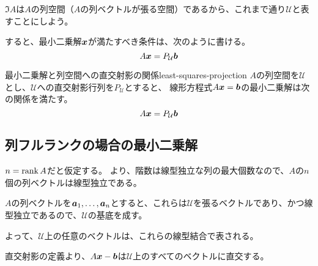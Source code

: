 \documentclass[../../../topic_linear-algebra]{subfiles}
\begin{document}
\br

$\Im A$は$A$の列空間（$A$の列ベクトルが張る空間）であるから、これまで通り$\mathcal{U}$と表すことにしよう。

すると、最小二乗解$\vb*{x}$が満たすべき条件は、次のように書ける。
\begin{equation*}
  A\vb*{x} = P_{\mathcal{U}}\vb*{b}
\end{equation*}

\begin{theorem}{最小二乗解と列空間への直交射影の関係}{least-squares-projection}
  $A$の列空間を$\mathcal{U}$とし、$\mathcal{U}$への直交射影行列を$P_{\mathcal{U}}$とすると、
  線形方程式$A\vb*{x} = \vb*{b}$の最小二乗解は次の関係を満たす。
  \begin{equation*}
    A\vb*{x} = P_{\mathcal{U}}\vb*{b}
  \end{equation*}
\end{theorem}

\subsection{列フルランクの場合の最小二乗解}

$n = \rank A$だと仮定する。
より、階数は線型独立な列の最大個数なので、$A$の$n$個の列ベクトルは線型独立である。

\br

$A$の列ベクトルを$\vb*{a}_1, \ldots, \vb*{a}_n$とすると、これらは$\mathcal{U}$を張るベクトルであり、かつ線型独立であるので、$\mathcal{U}$の基底を成す。

よって、$\mathcal{U}$上の任意のベクトルは、これらの線型結合で表される。

\br

直交射影の定義より、$A\vb*{x} - \vb*{b}$は$\mathcal{U}$上のすべてのベクトルに直交する。

\br
\end{document}
